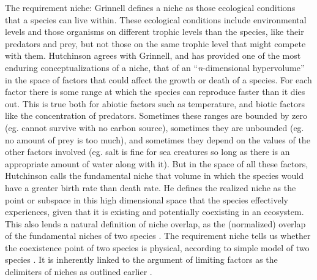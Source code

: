 The requirement niche:
Grinnell \cite{Grinnell1917} defines a niche as those ecological conditions that a species can live within. 
These ecological conditions include environmental levels and those organisms on different trophic levels than the species, like their predators and prey, but not those on the same trophic level that might compete with them.
Hutchinson \cite{Hutchinson1957} agrees with Grinnell, and has provided one of the most enduring conceptualizations of a niche, that of an ``\emph{n}-dimensional hypervolume'' in the space of factors that could affect the growth or death of a species.
For each factor there is some range at which the species can reproduce faster than it dies out.
This is true both for abiotic factors such as temperature, and biotic factors like the concentration of predators.
Sometimes these ranges are bounded by zero (eg. cannot survive with no carbon source), sometimes they are unbounded (eg. no amount of prey is too much), and sometimes they depend on the values of the other factors involved (eg. salt is fine for sea creatures so long as there is an appropriate amount of water along with it). 
But in the space of all these factors, Hutchinson calls the fundamental niche that volume in which the species would have a greater birth rate than death rate. 
He defines the realized niche as the point or subspace in this high dimensional space that the species effectively experiences, given that it is existing and potentially coexisting in an ecosystem. 
This also lends a natural definition of niche overlap, as the (normalized) overlap of the fundamental niches of two species \cite{MacArthur1967}. 
The requirement niche tells us whether the coexistence point of two species is physical, according to simple model of two species \cite{Holt1994}. 
It is inherently linked to the argument of limiting factors as the delimiters of niches as outlined earlier \cite{Armstrong1976,McGehee1977a,Armstrong1980}. %

